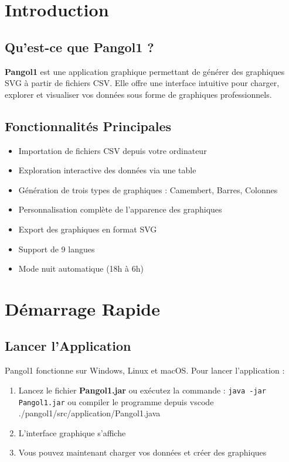 \documentclass[11pt, a4paper]{article}
\begin{document}
\newpage

\section{Introduction}

\subsection{Qu'est-ce que Pangol1 ?}
\textbf{Pangol1} est une application graphique permettant de générer des graphiques SVG à partir de fichiers CSV. Elle offre une interface intuitive pour charger, explorer et visualiser vos données sous forme de graphiques professionnels.

\subsection{Fonctionnalités Principales}
\begin{itemize}
    \item Importation de fichiers CSV depuis votre ordinateur
    \item Exploration interactive des données via une table
    \item Génération de trois types de graphiques : Camembert, Barres, Colonnes
    \item Personnalisation complète de l'apparence des graphiques
    \item Export des graphiques en format SVG
    \item Support de 9 langues
    \item Mode nuit automatique (18h à 6h)
\end{itemize}

\section{Démarrage Rapide}

\subsection{Lancer l'Application}
Pangol1 fonctionne sur Windows, Linux et macOS. Pour lancer l'application :

\begin{enumerate}
    \item Lancez le fichier \textbf{Pangol1.jar} ou exécutez la commande : \texttt{java -jar Pangol1.jar} ou compiler le programme depuis vscode ./pangol1/src/application/Pangol1.java
    \item L'interface graphique s'affiche
    \item Vous pouvez maintenant charger vos données et créer des graphiques
\end{enumerate}
\end{document}
